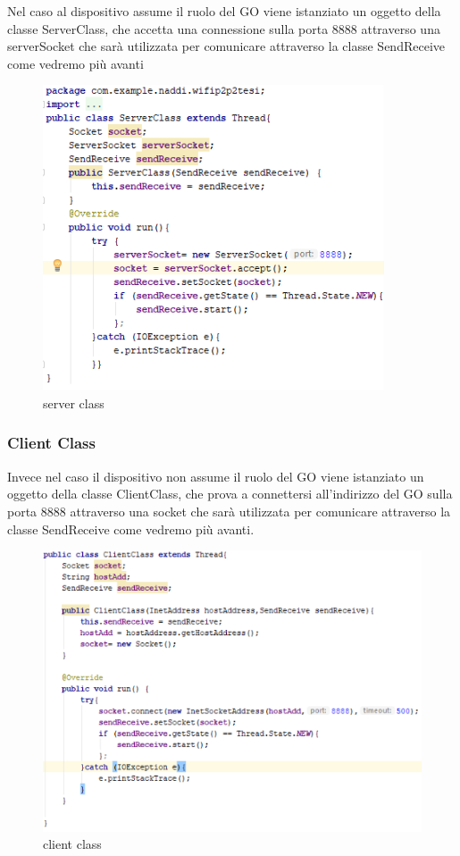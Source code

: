 Nel caso al dispositivo assume il ruolo del GO
viene istanziato un oggetto della  classe ServerClass,
che accetta una connessione sulla porta 8888
attraverso una serverSocket che sarà utilizzata per comunicare
attraverso la classe SendReceive come vedremo più avanti
\begin{figure}
   \caption{server class}
   \includegraphics[width=0.8\columnwidth]{imgs/serverClass.png}
   \centering
\end{figure}

\subsubsection{Client Class}

Invece nel caso il dispositivo non assume il ruolo del GO
viene istanziato un oggetto della classe ClientClass,
che prova a connettersi all'indirizzo del GO sulla porta 8888 attraverso
una socket che sarà utilizzata per comunicare
attraverso la classe SendReceive come vedremo più avanti.
\begin{figure}
   \caption{client class}
   \includegraphics[width=1\columnwidth]{imgs/clientClass.png}
   \centering
\end{figure}


